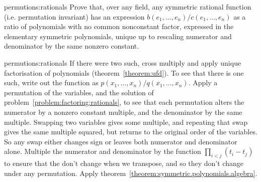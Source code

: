 \begin{problem}{permutions:rationals}
Prove that, over any field, any symmetric rational function (i.e. permutation invariant) has an expression \(b(e_1,\dots,e_n)/c(e_1,\dots,e_n)\) as a ratio of polynomials with no common nonconstant factor, expressed in the elementary symmetric polynomials, unique up to rescaling numerator and denominator by the same nonzero constant.
\end{problem}
\begin{answer}{permutions:rationals}
If there were two such, cross multiply and apply unique factorisation of polynomials (theorem~\vref{theorem:ufd}).
To see that there is one such, write out the function as \(p(x_1,\dots,x_n)/q(x_1,\dots,x_n)\).
Apply a permutation of the variables, and the solution of problem~\vref{problem:factoring:rationals}, to see that each permutation alters the numerator by a nonzero constant multiple, and the denominator by the same multiple.
Swapping two variables gives some multiple, and repeating that swap gives the same multiple squared, but returns to the original order of the variables.
So any swap either changes sign or leaves both numerator and denominator alone.
Multiple the numerator and denominator by the function \(\prod_{i<j}(t_i - t_j)\) to ensure that the don't change when we transpose, and so they don't change under any permutation.
Apply theorem~\vref{theorem:symmetric.polynomials.algebra}.
\end{answer}
